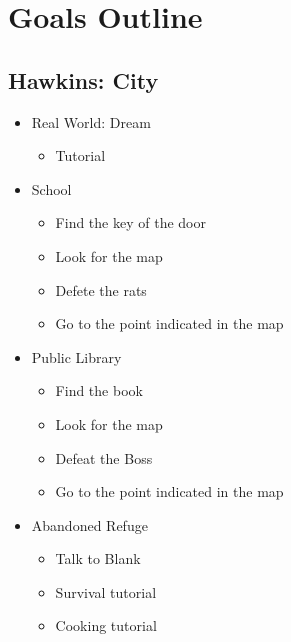 \section{Goals Outline}

\subsection{Hawkins: City}
\begin{itemize}
	\item Real World: Dream
	\begin{itemize}
		\item Tutorial
	\end{itemize}
\end{itemize}
\begin{itemize}
	\item School
	\begin{itemize}
		\item Find the key of the door
		\item Look for the map
		\item Defete the rats
		\item Go to the point indicated in the map
	\end{itemize}
	\item Public Library
	\begin{itemize}
		\item Find the book
		\item Look for the map
		\item Defeat the Boss
		\item Go to the point indicated in the map
	\end{itemize}
	\item Abandoned Refuge
	\begin{itemize}
		\item Talk to Blank
		\item Survival tutorial
		\item Cooking tutorial
	\end{itemize}
\end{itemize}

